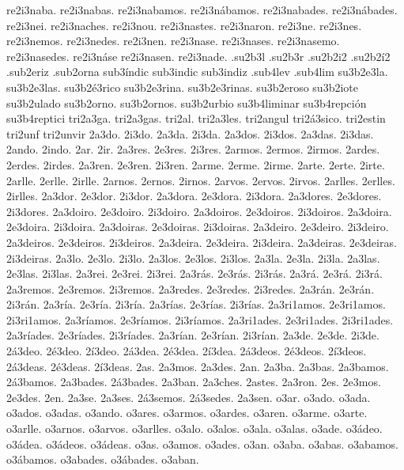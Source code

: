 {re2i3naba. re2i3nabas. re2i3nabamos. re2i3nábamos. re2i3nabades. re2i3nábades.
re2i3nei. re2i3naches. re2i3nou. re2i3nastes. re2i3naron.
re2i3ne. re2i3nes. re2i3nemos. re2i3nedes. re2i3nen.
re2i3nase. re2i3nases. re2i3nasemo. re2i3nasedes. re2i3náse re2i3nasen.
re2i3nade.
%
.su2b3l .su2b3r
%
.su2b2i2
.su2b2í2
.sub2eriz
.sub2orna
%
sub3índic sub3indic sub3indiz
%
.sub4lev
.sub4lim
%
su3b2e3la.
su3b2e3las.
su3b2é3rico
su3b2e3rina.
su3b2e3rinas.
su3b2eroso
su3b2iote
su3b2ulado
su3b2orno.
su3b2ornos.
su3b2urbio
%
su3b4liminar
su3b4repción
su3b4reptici
%
%
tri2a3ga.
tri2a3gas.
tri2al.
tri2a3les.
tri2angul
tri2á3sico.
tri2estin
tri2unf
tri2unvir
%
%
2a3do. 2i3do.
2a3da. 2i3da.
2a3dos. 2i3dos.
2a3das. 2i3das.
2ando. 2indo.
2ar. 2ir.
%
2a3res. 2e3res. 2i3res.
2armos. 2ermos. 2irmos.
2ardes. 2erdes. 2irdes.
2a3ren. 2e3ren. 2i3ren.
%
2arme. 2erme. 2irme.
2arte. 2erte. 2irte.
2arlle. 2erlle. 2irlle.
2arnos. 2ernos. 2irnos.
2arvos. 2ervos. 2irvos.
2arlles. 2erlles. 2irlles.
%
2a3dor. 2e3dor. 2i3dor.
2a3dora. 2e3dora. 2i3dora.
2a3dores. 2e3dores. 2i3dores.
2a3doiro. 2e3doiro. 2i3doiro.
2a3doiros. 2e3doiros. 2i3doiros.
2a3doira. 2e3doira. 2i3doira.
2a3doiras. 2e3doiras. 2i3doiras.
2a3deiro. 2e3deiro. 2i3deiro.
2a3deiros. 2e3deiros. 2i3deiros.
2a3deira. 2e3deira. 2i3deira.
2a3deiras. 2e3deiras. 2i3deiras.
2a3lo. 2e3lo. 2i3lo.
2a3los. 2e3los. 2i3los.
2a3la. 2e3la. 2i3la.
2a3las. 2e3las. 2i3las.
2a3rei. 2e3rei. 2i3rei.
2a3rás. 2e3rás. 2i3rás.
2a3rá. 2e3rá. 2i3rá.
2a3remos. 2e3remos. 2i3remos.
2a3redes. 2e3redes. 2i3redes.
2a3rán. 2e3rán. 2i3rán.
%
2a3ría. 2e3ría. 2i3ría.
2a3rías. 2e3rías. 2i3rías.
2a3ri1amos. 2e3ri1amos. 2i3ri1amos.
2a3ríamos. 2e3ríamos. 2i3ríamos.
2a3ri1ades. 2e3ri1ades. 2i3ri1ades.
2a3ríades. 2e3ríades. 2i3ríades.
2a3rían. 2e3rían. 2i3rían.
%
2a3de. 2e3de. 2i3de.
%
2á3deo. 2é3deo. 2í3deo.
2á3dea. 2é3dea. 2í3dea.
2á3deos. 2é3deos. 2í3deos.
2á3deas. 2é3deas. 2í3deas.
%
2as. 2a3mos. 2a3des. 2an.
2a3ba. 2a3bas. 2a3bamos. 2á3bamos. 2a3bades. 2á3bades. 2a3ban.
2a3ches. 2astes. 2a3ron.
2es. 2e3mos. 2e3des. 2en.
2a3se. 2a3ses. 2á3semos. 2á3sedes. 2a3sen.
%
o3ar. o3ado. o3ada. o3ados. o3adas. o3ando.
o3ares. o3armos. o3ardes. o3aren.
o3arme. o3arte. o3arlle. o3arnos. o3arvos. o3arlles.
o3alo. o3alos. o3ala. o3alas.
o3ade. o3ádeo. o3ádea. o3ádeos. o3ádeas.
o3as. o3amos. o3ades. o3an.
o3aba. o3abas. o3abamos. o3ábamos. o3abades. o3ábades. o3aban.
}
